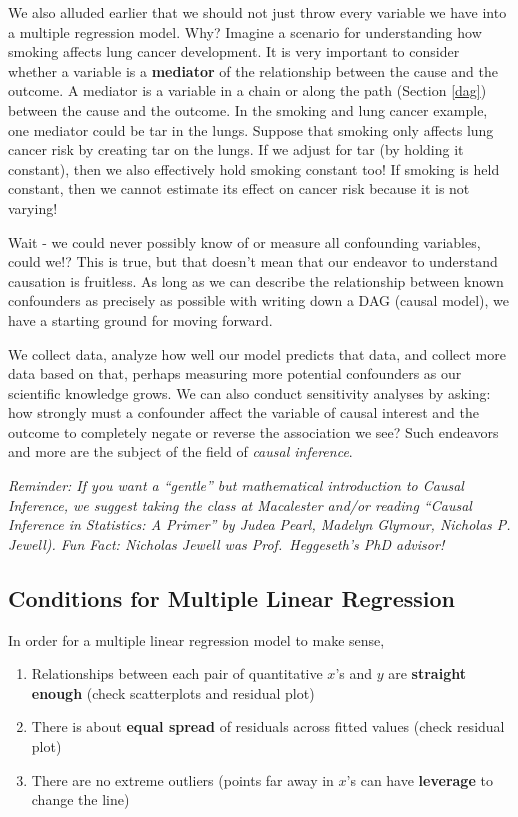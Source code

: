 \documentclass[]{book}
\providecommand{\tightlist}{%
  \setlength{\itemsep}{0pt}\setlength{\parskip}{0pt}}
\begin{document}
We also alluded earlier that we should not just throw every variable we have into a multiple regression model. Why? Imagine a scenario for understanding how smoking affects lung cancer development. It is very important to consider whether a variable is a \textbf{mediator} of the relationship between the cause and the outcome. A mediator is a variable in a chain or along the path (Section \ref{dag}) between the cause and the outcome. In the smoking and lung cancer example, one mediator could be tar in the lungs. Suppose that smoking only affects lung cancer risk by creating tar on the lungs. If we adjust for tar (by holding it constant), then we also effectively hold smoking constant too! If smoking is held constant, then we cannot estimate its effect on cancer risk because it is not varying!

Wait - we could never possibly know of or measure all confounding variables, could we!? This is true, but that doesn't mean that our endeavor to understand causation is fruitless. As long as we can describe the relationship between known confounders as precisely as possible with writing down a DAG (causal model), we have a starting ground for moving forward.

We collect data, analyze how well our model predicts that data, and collect more data based on that, perhaps measuring more potential confounders as our scientific knowledge grows. We can also conduct sensitivity analyses by asking: how strongly must a confounder affect the variable of causal interest and the outcome to completely negate or reverse the association we see? Such endeavors and more are the subject of the field of \emph{causal inference}.

\emph{Reminder: If you want a ``gentle'' but mathematical introduction to Causal Inference, we suggest taking the class at Macalester and/or reading ``Causal Inference in Statistics: A Primer'' by Judea Pearl, Madelyn Glymour, Nicholas P. Jewell). Fun Fact: Nicholas Jewell was Prof.~Heggeseth's PhD advisor!}

\hypertarget{conditions-for-multiple-linear-regression}{%
\subsection{Conditions for Multiple Linear Regression}\label{conditions-for-multiple-linear-regression}}

In order for a multiple linear regression model to make sense,

\begin{enumerate}
\def\labelenumi{\arabic{enumi}.}
\tightlist
\item
  Relationships between each pair of quantitative \(x\)'s and \(y\) are \textbf{straight enough} (check scatterplots and residual plot)
\item
  There is about \textbf{equal spread} of residuals across fitted values (check residual plot)
\item
  There are no extreme outliers (points far away in \(x\)'s can have \textbf{leverage} to change the line)
\end{enumerate}
\end{document}
